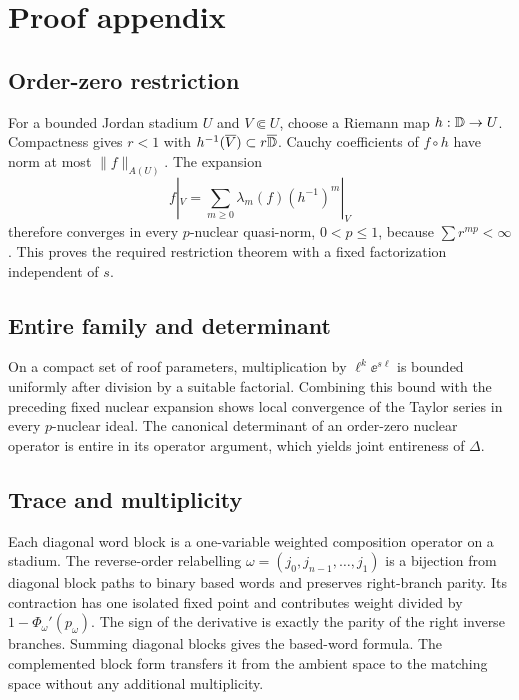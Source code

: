 \section{Proof appendix}
\subsection{Order-zero restriction}
For a bounded Jordan stadium \(U\) and \(V\Subset U\), choose a Riemann map
\(h:\mathbb{D}\to U\). Compactness gives \(r<1\) with
\(h^{-1}(\overline V)\subset r\overline{\mathbb{D}}\). Cauchy coefficients of
\(f\circ h\) have norm at most \(\|f\|_{A(U)}\). The expansion
\[
 f|_V=\sum_{m\ge0}\lambda_m(f)(h^{-1})^m|_V
\]
therefore converges in every \(p\)-nuclear quasi-norm,
\(0<p\le1\), because \(\sum r^{mp}<\infty\). This proves the required
restriction theorem with a fixed factorization independent of \(s\).

\subsection{Entire family and determinant}
On a compact set of roof parameters, multiplication by
\(\ell^k\ee^{s\ell}\) is bounded uniformly after division by a suitable
factorial. Combining this bound with the preceding fixed nuclear expansion
shows local convergence of the Taylor series in every \(p\)-nuclear ideal.
The canonical determinant of an order-zero nuclear operator is entire in its
operator argument, which yields joint entireness of \(\Delta\).

\subsection{Trace and multiplicity}
Each diagonal word block is a one-variable weighted composition operator on
a stadium. The reverse-order relabelling
\(\omega=(j_0,j_{n-1},\ldots,j_1)\) is a bijection from diagonal block paths
to binary based words and preserves right-branch parity. Its contraction has
one isolated fixed point and contributes
weight divided by \(1-\Phi_\omega'(p_\omega)\). The sign of the derivative
is exactly the parity of the right inverse branches. Summing diagonal blocks
gives the based-word formula. The complemented block form transfers it from
the ambient space to the matching space without any additional multiplicity.
